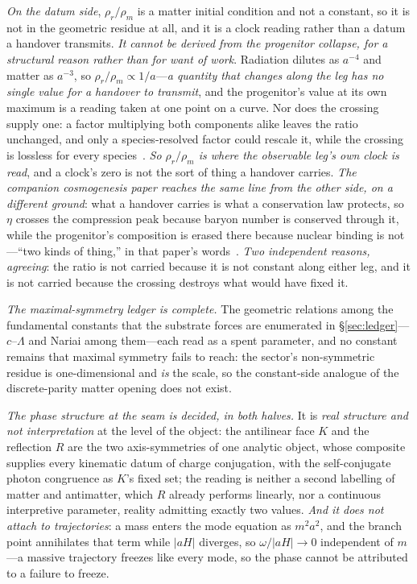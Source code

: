 \documentclass[11pt,a4paper]{article}
\theoremstyle{definition}
\begin{document}
\begin{enumerate}
\emph{On the datum side}, $\rho_r/\rho_m$ is a matter initial condition and not a constant, so it is not in the geometric residue at all, and it is a clock reading rather than a datum a handover transmits. \emph{It cannot
be derived from the progenitor collapse, for a structural reason rather than for want of
work}. Radiation dilutes as $a^{-4}$ and matter
as $a^{-3}$, so $\rho_r/\rho_m\propto1/a$---\emph{a quantity that changes along the leg has no single value
for a handover to transmit}, and the progenitor's value at its own maximum is a reading taken at one point on
a curve. Nor does the crossing supply one: a factor multiplying both components alike leaves the ratio
unchanged, and only a species-resolved factor could rescale it, while the crossing is lossless for every
species~\cite{JanzenCRframework}. \emph{So $\rho_r/\rho_m$ is where the observable leg's own clock is read},
and a clock's zero is not the sort of thing a handover carries. \emph{The companion cosmogenesis paper reaches
the same line from the other side, on a different ground}: what a handover carries is what a conservation law
protects, so $\eta$ crosses the compression peak because baryon number is conserved through it, while the
progenitor's composition is erased there because nuclear binding is not---``two kinds of thing,'' in that
paper's words~\cite{JanzenCosmogenesis}. \emph{Two independent reasons, agreeing}: the ratio is not carried
because it is not constant along either leg, and it is not carried because the crossing destroys what would
have fixed it.
\end{enumerate}

\emph{The maximal-symmetry ledger is complete.} The geometric relations among the fundamental constants that
the substrate forces are enumerated in \S\ref{sec:ledger}---$c$--$\Lambda$ and Nariai among them---each read
as a spent parameter, and no constant remains that maximal symmetry fails to reach: the sector's
non-symmetric residue is one-dimensional and \emph{is} the scale, so the constant-side analogue of the
discrete-parity matter opening does not exist.

\emph{The phase structure at the seam is decided, in both halves.} It is \emph{real structure and not
interpretation} at the level of the object: the antilinear face $K$ and the reflection $R$ are the two
axis-symmetries of one analytic object, whose composite supplies every kinematic datum of charge
conjugation, with the self-conjugate photon congruence as $K$'s fixed set; the reading is neither a second
labelling of matter and antimatter, which $R$ already performs linearly, nor a continuous interpretive
parameter, reality admitting exactly two values. \emph{And it does not attach to trajectories}: a mass enters
the mode equation as $m^{2}a^{2}$, and the branch point annihilates that term while $|aH|$ diverges, so
$\omega/|aH|\to0$ independent of $m$---a massive trajectory freezes like every mode, so the phase cannot be
attributed to a failure to freeze.
\end{document}
